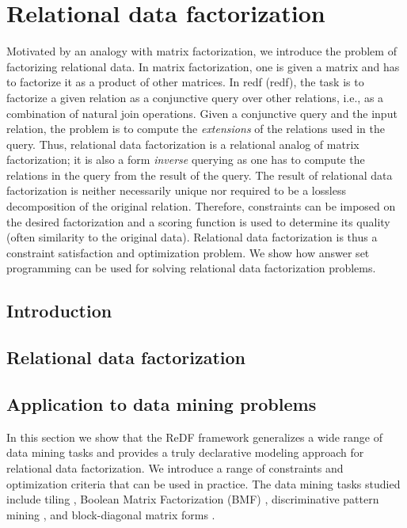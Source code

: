\chapter{Relational data factorization}\label{ch:ReDF}
\newcommand{\redfpath}{chapters/ReDF/tex_files}


Motivated by an analogy with matrix factorization, we introduce the problem of factorizing relational data. In matrix factorization, one is given a matrix and has to factorize it as a product of other matrices. In \acrlong{redf} (\acrshort{redf}), the task is to factorize a given relation as a conjunctive query over other relations, i.e., as a combination of natural join operations. Given a conjunctive query and the input relation, the problem is to compute the \emph{extensions} of the relations used in the query. Thus, relational data factorization is a relational analog of matrix factorization; it is also a form {\em inverse} querying as one has to compute the relations in the query from the result of the query.  The result of relational data factorization is neither necessarily unique nor required to be a lossless decomposition of the original relation. Therefore, constraints can be imposed on the desired factorization and a scoring function is used to determine its quality (often similarity to the original data). Relational data factorization is thus a constraint satisfaction and optimization problem. We show how answer set programming can be used for solving relational data factorization problems. 


\section{Introduction}
 
\section{Relational data factorization}
\label{section:framework}


\section{Application to data mining problems}
\label{section:dm_problems}

In this section we show that the ReDF framework generalizes a wide range of data mining tasks and provides a truly declarative modeling approach for relational data factorization. We introduce a range of constraints and optimization criteria that can be used in practice. The data mining tasks studied include tiling \parencite{tiling},  Boolean Matrix Factorization (BMF) \parencite{dbp}, discriminative pattern mining \parencite{DBLP:conf/pkdd/KnobbeH06}, and block-diagonal matrix forms \parencite{blockdiagonal}.%

